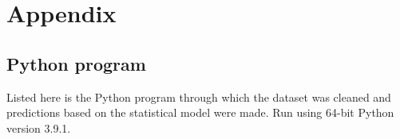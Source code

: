 \documentclass[11pt,letterpaper]{article}
\begin{document}
\printbibliography[heading=bibintoc, title=Works Cited]

\appendix
\section{Appendix}
\label{app}
\subsection{Python program}
\label{app:scripts}

Listed here is the Python program through which the dataset was cleaned and
predictions based on the statistical model were made. Run using 64-bit Python
version 3.9.1.


\end{document}
